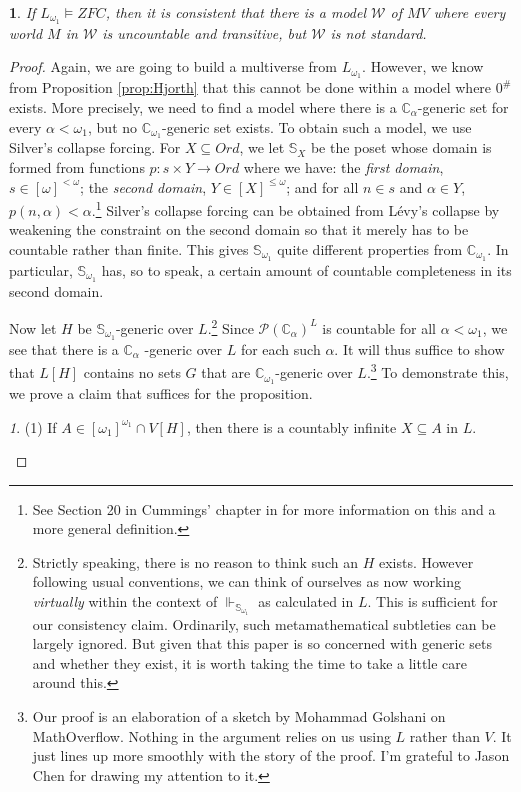 \documentclass[10pt,a4paper]{amsart}
\numberwithin{equation}{section}
\numberwithin{figure}{section}
\theoremstyle{plain}
\theoremstyle{plain}
\theoremstyle{plain}
\theoremstyle{plain}
\newtheorem{prop}[thm]{\protect\propositionname}
\theoremstyle{remark}
\newtheorem*{claim*}{\protect\claimname}
\theoremstyle{plain}
\theoremstyle{definition}
\providecommand{\claimname}{Claim}
\providecommand{\propositionname}{Proposition}
\begin{document}
\begin{prop}
If $L_{\omega_{1}}\models ZFC$, then it is consistent that there
is a model $\mathcal{W}$ of $MV$ where every world $M$ in $\mathcal{W}$
is uncountable and transitive, but $\mathcal{W}$ is not standard.
\end{prop}

\begin{proof}
Again, we are going to build a multiverse from $L_{\omega_{1}}$.
However, we know from Proposition \ref{prop:Hjorth} that this cannot
be done within a model where $0^{\#}$ exists. More precisely, we
need to find a model where there is a $\mathbb{C}_{\alpha}$-generic
set for every $\alpha<\omega_{1}$, but no $\mathbb{C}_{\omega_{1}}$-generic
set exists. To obtain such a model, we use Silver's collapse forcing.
For $X\subseteq Ord$, we let $\mathbb{S}_{X}$ be the poset whose
domain is formed from functions $p:s\times Y\to Ord$ where we have:
the \emph{first domain}, $s\in[\omega]^{<\omega}$; the \emph{second
domain},\emph{ }$Y\in[X]^{\leq\omega}$; and for all $n\in s$ and
$\alpha\in Y$, $p(n,\alpha)<\alpha$.\footnote{See Section 20 in Cummings' chapter in \citep{foreman2009handbook}
for more information on this and a more general definition.} Silver's collapse forcing can be obtained from L\'{e}vy's collapse by
weakening the constraint on the second domain so that it merely has
to be countable rather than finite. This gives $\mathbb{S}_{\omega_{1}}$
quite different properties from $\mathbb{C}_{\omega_{1}}$. In particular,
$\mathbb{S}_{\omega_{1}}$ has, so to speak, a certain amount of countable
completeness in its second domain. 

Now let $H$ be $\mathbb{S}_{\omega_{1}}$-generic over $L$.\footnote{Strictly speaking, there is no reason to think such an $H$ exists.
However following usual conventions, we can think of ourselves as
now working \emph{virtually} within the context of $\Vdash_{\mathbb{S}_{\omega_{1}}}$
as calculated in $L$. This is sufficient for our consistency claim.
Ordinarily, such metamathematical subtleties can be largely ignored.
But given that this paper is so concerned with generic sets and whether
they exist, it is worth taking the time to take a little care around
this.} Since $\mathcal{P}(\mathbb{C}_{\alpha})^{L}$ is countable for all
$\alpha<\omega_{1}$, we see that there is a $\mathbb{C}_{\alpha}$
-generic over $L$ for each such $\alpha$. It will thus suffice to
show that $L[H]$ contains no sets $G$ that are $\mathbb{C}_{\omega_{1}}$-generic
over $L$.\footnote{Our proof is an elaboration of a sketch by Mohammad Golshani on MathOverflow.
Nothing in the argument relies on us using $L$ rather than $V$.
It just lines up more smoothly with the story of the proof. I'm grateful
to Jason Chen for drawing my attention to it.} To demonstrate this, we prove a claim that suffices for the proposition.
\begin{claim*}
(1) If $A\in[\omega_{1}]^{\omega_{1}}\cap V[H]$, then there is a
countably infinite $X\subseteq A$ in $L$.


\end{claim*}
\end{proof}
\end{document}
